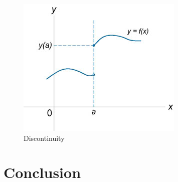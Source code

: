 \documentclass[14pt]{constructor-diploma}
\begin{document}
\begin{figure}[t]
\label{discontinuities}
\centering
\includegraphics{img/fig1.jpg}
\caption{Discontinuity}
\end{figure}

\section*{Conclusion}
\lipsum[1-2]

\setmonofont[Mapping=tex-text]{CMU Typewriter Text}
% 
% 
\printbibliography
\end{document}
